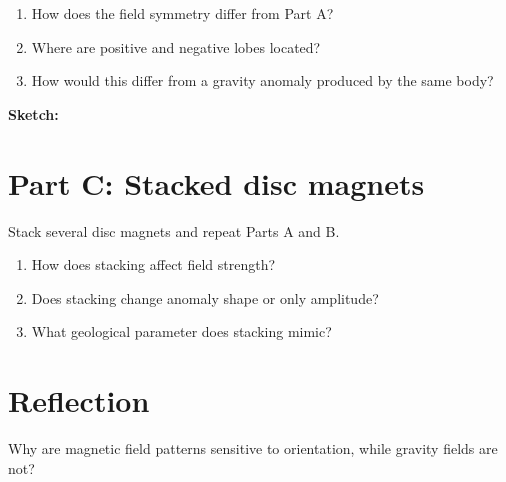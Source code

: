 \documentclass[11pt,a4paper]{article}
\begin{document}
\begin{enumerate}
  \item How does the field symmetry differ from Part A?
  \item Where are positive and negative lobes located?
  \item How would this differ from a gravity anomaly produced by the same body?
\end{enumerate}

\vspace{3cm}
\noindent\textbf{Sketch:}

\vspace{4cm}

\section*{Part C: Stacked disc magnets}

Stack several disc magnets and repeat Parts A and B.

\begin{enumerate}
  \item How does stacking affect field strength?
  \item Does stacking change anomaly shape or only amplitude?
  \item What geological parameter does stacking mimic?
\end{enumerate}

\section*{Reflection}

Why are magnetic field patterns sensitive to orientation, while gravity fields are not?
\end{document}
